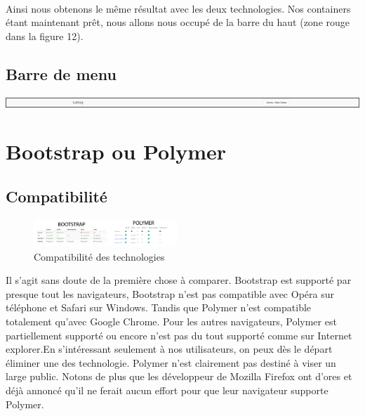 \documentclass{article}
\begin{document}
\vspace{0.5cm}\\
Ainsi nous obtenons le m\^eme r\'esultat avec les deux technologies. Nos containers \'etant maintenant pr\^et, nous allons nous occup\'e de la barre du haut (zone rouge dans la figure 12).

\subsection{Barre de menu}

\begin{center}
\vspace{0.5cm}
\includegraphics[width=\textwidth]{p19}
\vspace{0.5cm}\\
\end{center}


\newpage
\section{Bootstrap ou Polymer}

\subsection{Compatibilit\'e}

\begin{figure}
  \vspace{-25pt}
  \begin{center}
    \includegraphics[width=0.48\textwidth]{p14}
  \end{center}
  \vspace{-20pt}
  \caption{Compatibilit\'e des technologies}
  \vspace{-10pt}
\end{figure}

Il s'agit sans doute de la premi\`ere chose \`a comparer. Bootstrap est support\'e par presque tout les navigateurs, Bootstrap n'est pas compatible avec Op\'era sur t\'el\'ephone et Safari sur Windows. Tandis que Polymer n'est compatible totalement qu'avec Google Chrome. Pour les autres navigateurs, Polymer est partiellement support\'e ou encore n'est pas du tout support\'e comme sur Internet explorer.En s'int\'eressant seulement \`a nos utilisateurs, on peux d\`es le d\'epart \'eliminer une des technologie. Polymer n'est clairement pas destin\'e \`a viser un large public. Notons de plus que les d\'eveloppeur de Mozilla Firefox ont d'ores et d\'ej\`a annonc\'e qu'il ne ferait aucun effort pour que leur navigateur supporte Polymer.\\
\end{document}
